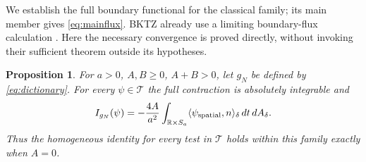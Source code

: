 \documentclass[11pt]{article}
\newtheorem{proposition}{Proposition}
\newcommand{\dA}{\,dA}
\begin{document}
We establish the full boundary functional for the classical family; its
main member gives \eqref{eq:mainflux}. BKTZ already use a limiting
boundary-flux calculation \cite[Definition~2.1 and the calculation following
equation~(2.5)]{BKTZ}. Here the necessary convergence is proved directly,
without invoking their sufficient theorem outside its hypotheses.

\begin{proposition}\label{prop:flux}
For $a>0$, $A,B\ge0$, $A+B>0$, let $g_N$ be defined by
\eqref{eq:dictionary}. For every $\psi\in\mathcal T$ the full contraction is
absolutely integrable and
\begin{equation}\label{eq:familyflux}
 I_{g_N}(\psi)=-\frac{4A}{a^2}
 \int_{\mathbb R\times S_a}
       \langle\psi_{\rm spatial},n\rangle_\delta\,dt\dA_\delta.
\end{equation}
Thus the homogeneous identity for every test in $\mathcal T$ holds within
this family exactly when $A=0$.
\end{proposition}
\end{document}

